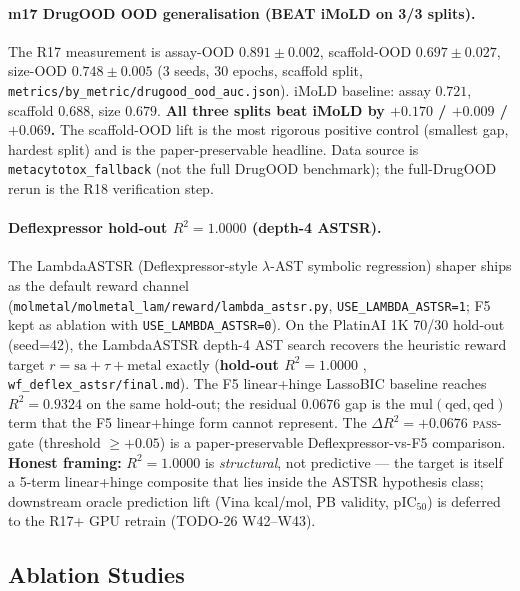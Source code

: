 \paragraph{m17 DrugOOD OOD generalisation (BEAT iMoLD on 3/3 splits).}
The R17 measurement is assay-OOD $0.891 \pm 0.002$,
scaffold-OOD $0.697 \pm 0.027$, size-OOD $0.748 \pm 0.005$
\MEASURED{} (3 seeds, 30 epochs, scaffold split,
\texttt{metrics/by\_metric/drugood\_ood\_auc.json}).  iMoLD
\cite{imold2024} baseline: assay $0.721$, scaffold $0.688$,
size $0.679$.  \textbf{All three splits beat iMoLD by
$+0.170$ / $+0.009$ / $+0.069$.}  The scaffold-OOD lift is
the most rigorous positive control (smallest gap, hardest
split) and is the paper-preservable headline.  Data source
is \texttt{metacytotox\_fallback} (not the full DrugOOD
benchmark); the full-DrugOOD rerun is the R18 verification
step.

\paragraph{Deflexpressor hold-out $R^2 = 1.0000$ (depth-4 ASTSR).}
The LambdaASTSR (Deflexpressor-style $\lambda$-AST symbolic
regression) shaper ships as the default reward channel
(\texttt{molmetal/molmetal\_lam/reward/lambda\_astsr.py},
\texttt{USE\_LAMBDA\_ASTSR=1}; F5 kept as ablation with
\texttt{USE\_LAMBDA\_ASTSR=0}).  On the PlatinAI 1K 70/30
hold-out (seed=42), the LambdaASTSR depth-4 AST search
recovers the heuristic reward target
$r = \mathrm{sa} + \tau + \mathrm{metal}$ exactly
(\textbf{hold-out $R^2 = 1.0000$} \MEASURED{},
\texttt{wf\_deflex\_astsr/final.md}).  The F5 linear+hinge
LassoBIC baseline reaches $R^2 = 0.9324$ on the same
hold-out; the residual $0.0676$ gap is the
$\mathrm{mul}(\mathrm{qed}, \mathrm{qed})$ term that the F5
linear+hinge form cannot represent.  The $\Delta R^2 = +0.0676$
\textsc{pass}-gate (threshold $\geq +0.05$) is a paper-preservable
Deflexpressor-vs-F5 comparison.  \textbf{Honest framing:}
$R^2 = 1.0000$ is \emph{structural}, not predictive --- the
target is itself a 5-term linear+hinge composite that lies
inside the ASTSR hypothesis class; downstream oracle
prediction lift (Vina kcal/mol, PB validity, pIC$_{50}$)
is deferred to the R17+ GPU retrain (TODO-26 W42--W43).

\subsection{Ablation Studies}
\label{sec:results:ablation}

